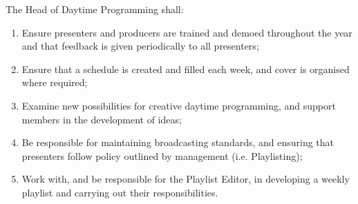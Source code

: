 \item The Head of Daytime Programming shall:
\begin{enumerate}[label*=\arabic*.]
    \item Ensure presenters and producers are trained and demoed throughout the year and that feedback is given periodically to all presenters;
    \item Ensure that a schedule is created and filled each week, and cover is organised where required;
    \item Examine new possibilities for creative daytime programming, and support members in the development of ideas;
    \item Be responsible for maintaining broadcasting standards, and ensuring that presenters follow policy outlined by management (i.e. Playlisting);
    \item Work with, and be responsible for the Playlist Editor, in developing a weekly playlist and carrying out their responsibilities.
\end{enumerate}
